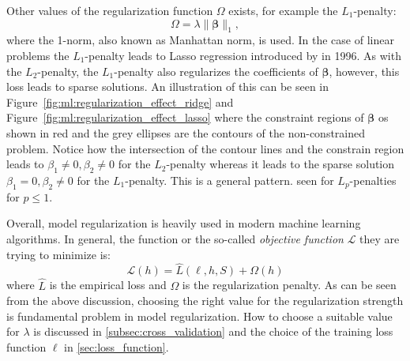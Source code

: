 \documentclass[a4paper, twoside, nobib]{tufte-book}
\newcommand{\norm}[1]{\lVert#1\rVert}
\begin{document}
Other values of the regularization function $\Omega$ exists, for example the $L_1$-penalty:
\begin{equation}
  \Omega = \lambda \norm{\bm{\beta}}_1, 
\end{equation}
where the 1-norm, also known as Manhattan norm, is used. In the case of linear problems the $L_1$-penalty leads to Lasso regression introduced by \citet{tibshiraniRegressionShrinkageSelection1996} in \num{1996}. As with the $L_2$-penalty, the $L_1$-penalty also regularizes the coefficients of $\bm{\beta}$, however, this loss leads to sparse solutions. An illustration of this can be seen in Figure~\ref{fig:ml:regularization_effect_ridge} and Figure~\ref{fig:ml:regularization_effect_lasso} where the constraint regions of $\bm{\beta}$ os shown in red and the grey ellipses are the contours of the non-constrained problem. Notice how the intersection of the contour lines and the constrain region leads to $\beta_1 \neq 0, \beta_2 \neq 0$ for the $L_2$-penalty whereas it leads to the sparse solution $\beta_1=0, \beta_2 \neq 0$ for the $L_1$-penalty. This is a general pattern. seen for $L_p$-penalties for $p \leq 1$.

Overall, model regularization is heavily used in modern machine learning algorithms. In general, the function or the so-called \emph{objective function} $\mathcal{L}$ they are trying to minimize is:
\begin{equation}
  \mathcal{L}(h) = \hat{L}(\ell, h, S) + \Omega(h)
\end{equation}
where $\hat{L}$ is the empirical loss and $\Omega$ is the regularization penalty. As can be seen from the above discussion, choosing the right value for the regularization strength is fundamental problem in model regularization. How to choose a suitable value for $\lambda$ is discussed in \autoref{subsec:cross_validation} and the choice of the training loss function $\ell$ in \autoref{sec:loss_function}. 
\end{document}
